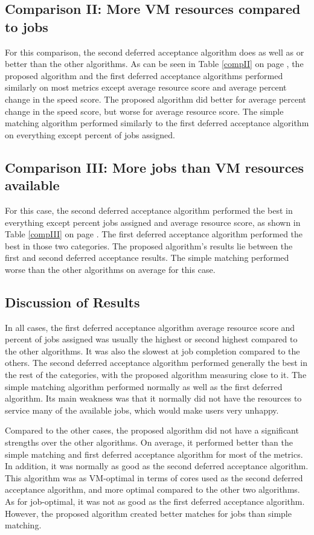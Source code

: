 \documentclass[conference]{IEEEtran}
\begin{document}
\subsection{Comparison II: More VM resources compared to jobs}

For this comparison, the second deferred acceptance algorithm does as well as or
better than the other algorithms.  As can be seen in Table \ref{compII} on page
\pageref{compII},
the proposed algorithm and the first deferred
acceptance algorithms performed similarly on most metrics except average resource 
score and average percent change in the speed score.  The proposed algorithm did
better for average percent change in the speed score, but worse for average 
resource score.  The simple matching algorithm performed similarly to the first
deferred acceptance algorithm on everything except percent of jobs assigned.

\subsection{Comparison III: More jobs than VM resources available}

For this case, the second deferred acceptance algorithm performed the best in
 everything except percent jobs assigned and average resource score, as shown
 in Table \ref{compIII} on page \pageref{compIII}.  The first 
deferred acceptance algorithm performed the best in those two categories. 
 The proposed algorithm's results lie between the first and second deferred 
acceptance results.  The simple matching performed worse than the other 
algorithms on average for this case.


\subsection{Discussion of Results}
In all cases, the first deferred acceptance algorithm average resource 
score and percent of jobs assigned was usually the highest or second
 highest compared to the other algorithms.  It was also the slowest at 
job completion compared to the others.  The second deferred acceptance
 algorithm performed generally the best in the rest of the categories, with
 the proposed algorithm measuring close to it.  The simple matching algorithm
 performed normally as well as the first deferred algorithm.  Its main 
weakness was that it normally did not have the resources to service 
many of the available jobs, which would make users very unhappy.

Compared to the other cases, the proposed algorithm did not have a
significant strengths over the other algorithms.  On average, 
it performed better than the simple matching and first deferred 
acceptance algorithm for most of the metrics.  In addition, it was 
normally as good as the second deferred acceptance algorithm. 
 This algorithm was as VM-optimal in terms of cores used as the second 
deferred acceptance algorithm, and more optimal compared to the other 
two algorithms.  As for job-optimal, it was not as good as the first 
deferred acceptance algorithm.  However, the proposed algorithm 
created better matches for jobs than simple matching.
\end{document}
